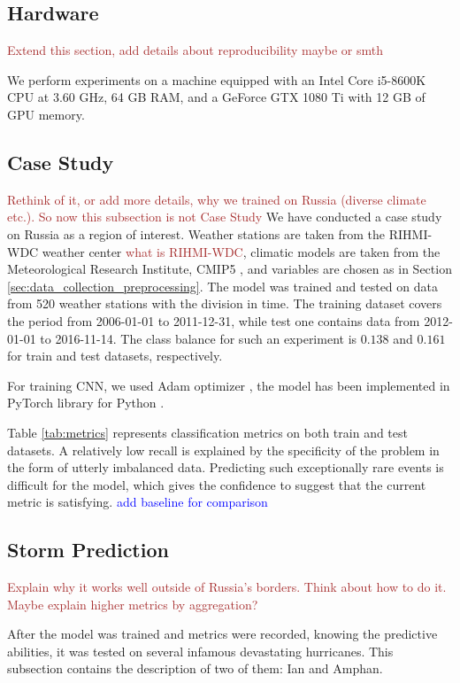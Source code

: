 \documentclass{article}
\begin{document}
\subsection{Hardware}
\textcolor{brown}{Extend this section, add details about reproducibility maybe or smth}

We perform experiments on a machine equipped with an Intel Core i5-8600K CPU at 3.60 GHz, 64 GB RAM, and a GeForce GTX 1080 Ti with 12 GB of GPU memory.
\subsection{Case Study}
\textcolor{brown}{Rethink of it, or add more details, why we trained on Russia (diverse climate etc.). So now this subsection is not Case Study} We have conducted a case study on Russia as a region of interest. Weather stations are taken from the RIHMI-WDC weather center \textcolor{brown}{what is RIHMI-WDC}, climatic models are taken from the Meteorological Research Institute, CMIP5 \cite{SeijiYukimoto20122012-A02}, and variables are chosen as in Section \ref{sec:data_collection_preprocessing}. The model was trained and tested on data from 520 weather stations with the division in time. The training dataset covers the period from 2006-01-01 to 2011-12-31, while test one contains data from 2012-01-01 to 2016-11-14. The class balance for such an experiment is $0.138$ and $0.161$ for train and test datasets, respectively.

For training CNN, we used Adam optimizer \cite{https://doi.org/10.48550/arxiv.1412.6980}, the model has been implemented in PyTorch library for Python \cite{paszke2019pytorch}.

Table \ref{tab:metrics} represents classification metrics on both train and test datasets. A relatively low recall is explained by the specificity of the problem in the form of utterly imbalanced data. Predicting such exceptionally rare events is difficult for the model, which gives the confidence to suggest that the current metric is satisfying. \textcolor{blue}{add baseline for comparison}

\subsection{Storm Prediction}

\textcolor{brown}{Explain why it works well outside of Russia's borders. Think about how to do it. Maybe explain higher metrics by aggregation?}

After the model was trained and metrics were recorded, knowing the predictive abilities, it was tested on several infamous devastating hurricanes. This subsection contains the description of two of them: Ian and Amphan.
\end{document}
